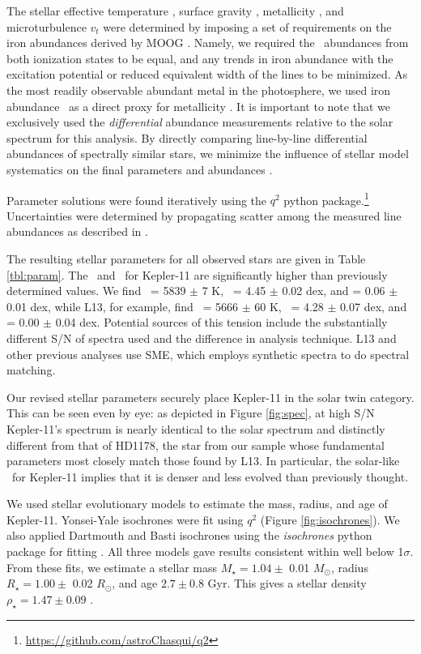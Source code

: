\documentclass[oneside]{emulateapj}
\begin{document}
The stellar effective temperature \teff, surface gravity \logg, metallicity \mh, and microturbulence $v_t$ were determined by imposing a set of requirements on the iron abundances derived by MOOG \citep{Sneden1973}. Namely, we required the \feh\ abundances from both ionization states to be equal, and any trends in iron abundance with the excitation potential or reduced equivalent width of the lines to be minimized. As the most readily observable abundant metal in the photosphere, we used iron abundance \feh\ as a direct proxy for metallicity \mh. It is important to note that we exclusively used the \textit{differential} abundance measurements relative to the solar spectrum for this analysis. By directly comparing line-by-line differential abundances of spectrally similar stars, we minimize the influence of stellar model systematics on the final parameters and abundances \citep[see e.g.][]{Ramirez2014}. 

Parameter solutions were found iteratively using the $q^2$ python package.\footnote{\url{https://github.com/astroChasqui/q2}} Uncertainties were determined by propagating scatter among the measured line abundances as described in \citet{Epstein2010, Bensby2014}.

The resulting stellar parameters for all observed stars are given in Table \ref{tbl:param}. The \teff\ and \logg\ for Kepler-11 are significantly higher than previously determined values. We find  \teff\ = 5839 $\pm$ 7 K, \logg\ = 4.45 $\pm$ 0.02 dex, and \feh = 0.06 $\pm$ 0.01 dex, while L13, for example, find \teff\ = 5666 $\pm$ 60 K, \logg\ = 4.28 $\pm$ 0.07 dex, and \feh = 0.00 $\pm$ 0.04 dex. Potential sources of this tension include the substantially different S/N of spectra used and the difference in analysis technique. L13 and other previous analyses use SME, which employs synthetic spectra to do spectral matching. 

Our revised stellar parameters securely place Kepler-11 in the solar twin category. This can be seen even by eye: as depicted in Figure \ref{fig:spec}, at high S/N Kepler-11's spectrum is nearly identical to the solar spectrum and distinctly different from that of HD1178, the star from our sample whose fundamental parameters most closely match those found by L13. In particular, the solar-like \logg\ for Kepler-11 implies that it is denser and less evolved than previously thought.

We used stellar evolutionary models to estimate the mass, radius, and age of Kepler-11. Yonsei-Yale isochrones were fit using $q^2$ (Figure \ref{fig:isochrones}). We also applied Dartmouth and Basti isochrones using the \textit{isochrones} python package for fitting \citep{Morton2015}. All three models gave results consistent within well below 1$\sigma$. From these fits, we estimate a stellar mass $M_{\star} = 1.04 \pm$ 0.01 $M_{\odot}$, radius $R_{\star} = 1.00 \pm$ 0.02 $R_{\odot}$, and age $2.7 \pm 0.8$ Gyr. This gives a stellar density $\rho_{\star} = 1.47 \pm 0.09$ \gcm.
\end{document}
